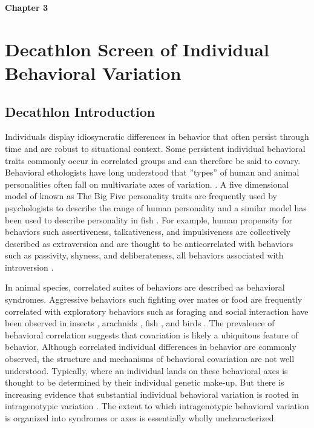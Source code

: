 \documentclass[12pt,letterpaper]{article}
\begin{document}
\clearpage
\begin{center}
    \Large\textbf{Chapter 3}
    \thispagestyle{empty}       %
    \clearpage
\end{center}
\section{Decathlon Screen of Individual Behavioral Variation}

\subsection{Decathlon Introduction}

Individuals display idiosyncratic differences in behavior that often persist through time and are robust to situational context. Some persistent individual behavioral traits commonly occur in correlated groups and can therefore be said to covary. Behavioral ethologists have long understood that ”types” of human and animal personalities often fall on multivariate axes of variation. . A five dimensional model \cite{goldberg_personality_1993} of known as The Big Five personality traits are frequently used by psychologists to describe the range of human personality and a similar model has been used to describe personality in fish \cite{reale_Integrating_2007}. For example, human propensity for behaviors such assertiveness, talkativeness, and impulsiveness are collectively described as extraversion and are thought to be anticorrelated with behaviors such as passivity, shyness, and deliberateness, all behaviors associated with introversion \cite{Matthews_Personality_2003}. 

In animal species, correlated suites of behaviors are described as behavioral syndromes. Aggressive behaviors such fighting over mates or food are frequently correlated with exploratory behaviors such as foraging and social interaction have been observed in insects \cite{Jeanson_Interindividual_2014}, arachnids \cite{Grinsted_Individual_2013}, fish \cite{Huntingford_Behaviour_1976}, and birds \cite{Oers_Realized_2004}. The prevalence of behavioral correlation suggests that covariation is likely a ubiquitous feature of behavior. Although correlated individual differences in behavior are commonly observed, the structure and mechanisms of behavioral covariation are not well understood. Typically, where an individual lands on these behavioral axes is thought to be determined by their individual genetic make-up. But there is increasing evidence that substantial individual behavioral variation is rooted in intragenotypic variation \cite{Honegger_Stochasticity_2018}. The extent to which intragenotypic behavioral variation is organized into syndromes or axes is essentially wholly uncharacterized. 
\end{document}
